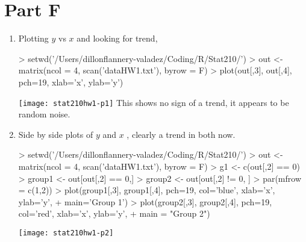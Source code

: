 \documentclass{article}
\begin{document}
\section*{Part F}
\begin{enumerate}
  \item Plotting $y$ vs $x$ and looking for trend,
\begin{Schunk}
\begin{Sinput}
> setwd('/Users/dillonflannery-valadez/Coding/R/Stat210/')
> out <-  matrix(ncol = 4, scan('dataHW1.txt'), byrow = F)
> plot(out[,3], out[,4], pch=19, xlab='x', ylab='y')
\end{Sinput}
\end{Schunk}
\texttt{[image: stat210hw1-p1]}
This shows no sign of a trend, it appears to be random noise. 

\item Side by side plots of $y$ and $x$ , clearly a trend in both now. 
\begin{Schunk}
\begin{Sinput}
> setwd('/Users/dillonflannery-valadez/Coding/R/Stat210/')
> out <-  matrix(ncol = 4, scan('dataHW1.txt'), byrow = F)
> g1 <- c(out[,2] == 0)
> group1 <- out[out[,2] == 0,]
> group2 <- out[out[,2] != 0, ]
> par(mfrow = c(1,2))
> plot(group1[,3], group1[,4], pch=19, col='blue', xlab='x', ylab='y',
+      main='Group 1')
> plot(group2[,3], group2[,4], pch=19, col='red', xlab='x', ylab='y', 
+      main = "Group 2")
\end{Sinput}
\end{Schunk}
\texttt{[image: stat210hw1-p2]}


\end{enumerate}
\end{document}
